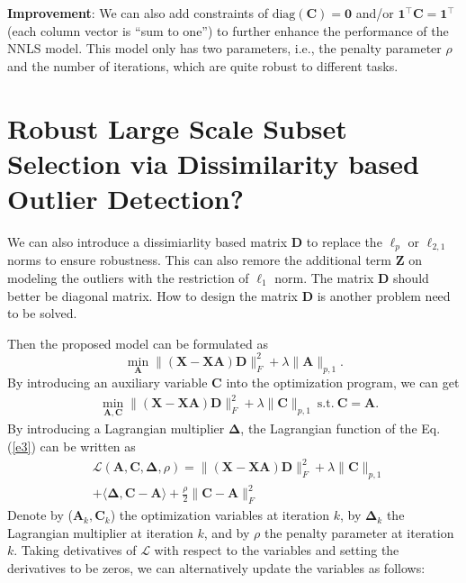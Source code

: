 \documentclass[10pt,twocolumn,letterpaper]{article}
\begin{document}
\textbf{Improvement}: We can also add constraints of $\text{diag}(\bm{C})=\bm{0}$ and/or $\bm{1}^{\top}\bm{C}=\bm{1}^{\top}$ (each column vector is ``sum to one'') to further enhance the performance of the NNLS model. This model only has two parameters, i.e., the penalty parameter $\rho$ and the number of iterations, which are quite robust to different tasks. 



\section{Robust Large Scale Subset Selection via Dissimilarity based Outlier Detection?}


We can also introduce a dissimiarlity based matrix $\bm{D}$ to replace the $\ell_{p}$ or $\ell_{2,1}$ norms to ensure robustness. This can also remore the additional term $\bm{Z}$ on modeling the outliers with the restriction of $\ell_{1}$ norm. The matrix $\bm{D}$ should better be diagonal matrix. How to design the matrix $\bm{D}$ is another problem need to be solved.

Then the proposed model can be formulated as  
\begin{equation}
\label{e2}
\min_{\bm{A}}
\|
(\bm{X}
-
\bm{X}\bm{A})
\bm{D}
\|_{F}^{2}
+
\lambda
\|
\bm{A}
\|_{p,1}
.
\end{equation}
By introducing an auxiliary variable $\bm{C}$ into the optimization program, we can get
\begin{equation}
\begin{split}
\label{e3}
&
\min_{\bm{A},\bm{C}}
\|
(\bm{X}
-
\bm{X}\bm{A})
\bm{D}
\|_{F}^{2}
+
\lambda
\|
\bm{C}
\|_{p,1}
\ 
\text{s.t.}
\ 
\bm{C}=\bm{A}
.
\end{split}
\end{equation}
By introducing a Lagrangian multiplier $\bm{\Delta}$, the Lagrangian function of the Eq. (\ref{e3}) can be written as
\begin{equation}
\begin{split}
\label{e5}
&
\mathcal{L}
(\bm{A},\bm{C},\bm{\Delta},\rho)
=
\|
(\bm{X}
-
\bm{X}\bm{A})
\bm{D}
\|_{F}^{2}
+
\lambda
\|
\bm{C}
\|_{p,1}
\\
&
+
\langle
\bm{\Delta},
\bm{C}-\bm{A}
\rangle
+
\frac{\rho}{2}
\|
\bm{C}
-
\bm{A}
\|_{F}^{2}
\end{split}
\end{equation}
Denote by ($\bm{A}_{k},\bm{C}_{k}$) the optimization variables at iteration $k$, by $\bm{\Delta}_{k}$ the Lagrangian multiplier at iteration $k$, and by $\rho$ the penalty parameter at iteration $k$. Taking detivatives of $\mathcal{L}$ with respect to the variables and setting the derivatives to be zeros, we can alternatively update the variables as follows:
\end{document}
